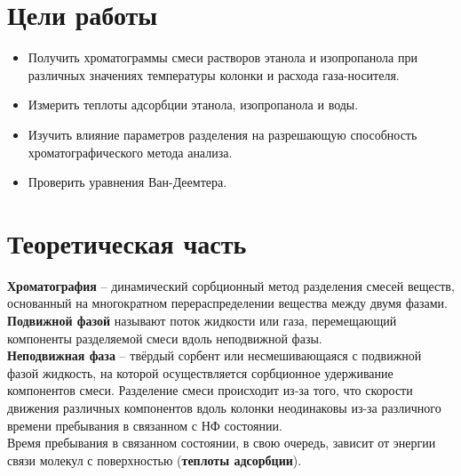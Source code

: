 \documentclass[12pt]{article}
\begin{document}
\begin{flushleft}
\section{ Цели работы}
\begin{itemize}
\item Получить хроматограммы смеси растворов этанола и изопропанола при
различных значениях температуры колонки и расхода газа-носителя.
\item Измерить теплоты
адсорбции этанола, изопропанола и воды.
\item Изучить влияние параметров разделения на
разрешающую способность хроматографического метода анализа.
\item Проверить уравнения Ван-Деемтера.

\end{itemize}

\section{Теоретическая часть}
\textbf{Хроматография} – динамический сорбционный метод разделения смесей веществ,
основанный на многократном перераспределении вещества между двумя фазами.\\
\textbf{Подвижной фазой} называют поток жидкости или газа, перемещающий
компоненты разделяемой смеси вдоль неподвижной фазы.\\
 \textbf{Неподвижная фаза} – 
твёрдый сорбент или несмешивающаяся с подвижной фазой жидкость, на которой
осуществляется сорбционное удерживание компонентов смеси. Разделение смеси
происходит из-за того, что скорости движения различных компонентов вдоль колонки
неодинаковы из-за различного времени пребывания в связанном с НФ состоянии.\\
 Время
пребывания в связанном состоянии, в свою очередь, зависит от энергии связи молекул с
поверхностью (\textbf{теплоты адсорбции}). 

\end{flushleft}
\end{document}
